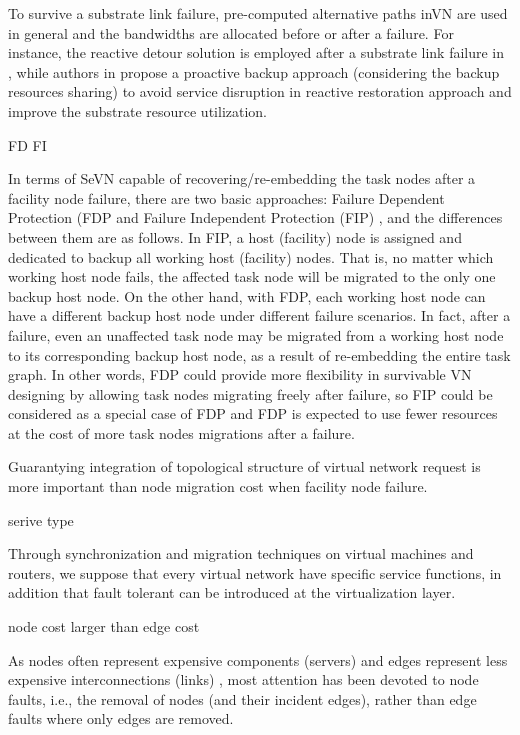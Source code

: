 To survive a substrate link failure, pre-computed alternative paths inVN are used in general and the bandwidths are allocated before or after a failure. For instance, the reactive detour solution is employed after a substrate link failure in \cite{rahman2010survivable}, while authors in \cite{rahman2013svne,guo2011shared} propose a proactive backup approach (considering the backup resources sharing) to avoid service disruption in reactive restoration approach and improve the substrate resource utilization.


FD  FI

In terms of SeVN capable of recovering/re-embedding the task nodes after a facility node failure, there are two basic approaches: Failure Dependent Protection (FDP \cite{yu2010survivable} and Failure Independent Protection (FIP) \cite{yeow2011designing}, and the differences between them are as follows. In FIP, a host (facility) node is assigned and dedicated to backup all working host (facility) nodes. That is, no matter which working host node fails, the affected task node will be migrated to the only one backup host node. On the other hand, with FDP, each working host node can have a different backup host node under different failure scenarios. In fact, after a failure, even an unaffected task node may be migrated from a working host node to its corresponding backup host node, as a result of re-embedding the entire task graph. In other words, FDP could provide more flexibility in survivable VN designing by allowing task nodes migrating freely after failure, so FIP could be considered as a special case of FDP and FDP is expected to use fewer resources at the cost of more task nodes migrations after a failure.


Guarantying integration of topological structure of virtual network request is more important than node migration cost when facility node failure.


serive type

Through synchronization\cite{bressoud1996hypervisor,cully2008remus} and migration techniques\cite{clark2005live,wang2008virtual} on virtual machines and routers, we suppose that every virtual network have specific service functions, in addition that fault tolerant can be introduced at the virtualization layer\cite{yeow2011designing}. \cite{qu2016delay}

node cost larger than edge cost

As nodes often represent expensive components (servers) and edges represent less expensive interconnections (links) \cite{armbrust2009above,yu2010survivable}, most attention has been devoted to node faults, i.e., the removal of nodes (and their incident edges), rather than edge faults where only edges are removed.


